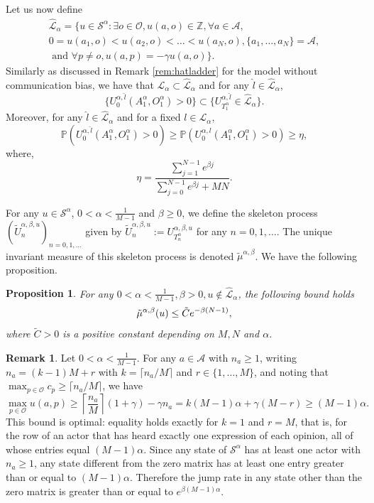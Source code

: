 \documentclass[11pt]{article}
\newtheorem{proposition}[theorem]{Proposition}
\theoremstyle{definition}
\newtheorem{remark}{Remark}
\newcommand\ddfrac[2]{\frac{\displaystyle #1}{\displaystyle #2}}
\newcommand{\st}{\mathcal{S}}
\newcommand{\A}{\mathcal{A}}
\newcommand{\opn}{\mathcal{O}}
\begin{document}
Let us now define
\begin{multline*}
    \hat{\mathcal{L}}_{\alpha}=\{u\in\mathcal{S}^{\alpha}:\exists o\in\mathcal{O}, u(a,o) \in \mathbb{Z}, \forall a \in \A, \\
    0=u(a_1,o) < u(a_2,o) < \ldots < u(a_N,o), \{a_1,\ldots,a_N\}=\A,
    \\
    \text{ and } \forall p\neq o, u(a,p)=-\gamma u(a,o)\}.
\end{multline*}
Similarly as discussed in Remark \ref{rem:hatladder} for the model without communication bias, we have that $\mathcal{L}_{\alpha}\subset \hat{\mathcal{L}}_{\alpha}$ and for any $\hat{l} \in \hat{\mathcal{L}}_{\alpha}$, 
$$\{U^{\alpha,\hat{l}}_0(A_1^{\alpha},O_1^{\alpha})>0\} \subset \{ U^{\alpha,\hat{l}}_{T_1^{\alpha}} \in \hat{\mathcal{L}}_{\alpha}\}.
$$
Moreover, for any $\hat{l}\in\hat{\mathcal{L}}_{\alpha}$ and for a fixed $l\in \mathcal{L}_{\alpha}$,
$$
\mathbb{P}(U^{\alpha,\hat{l}}_0(A_1^{\alpha},O_1^{\alpha})>0)\geq \mathbb{P}(U^{\alpha,l}_0(A_1^{\alpha},O_1^{\alpha})>0)\geq \eta,
$$
where,
    $$
        \eta = \ddfrac{\sum^{N-1}_{j=1}e^{\beta j}}{\sum^{N-1}_{j=0}e^{\beta j}+MN}.
    $$


For any $u\in \st^{\alpha}$, $0<\alpha<\frac{1}{M-1}$ and $\beta \geq 0$, we define the skeleton process $(\tilde{U}_n^{\alpha,\beta,u})_{n=0,1,\ldots}$ given by $\tilde{U}_n^{\alpha,\beta,u}:= U_{T_n^{\alpha}}^{\alpha,\beta,u}$ for any $n=0,1,\ldots$. The unique invariant measure of this skeleton process is denoted $\tilde{\mu}^{\alpha,\beta}$. 
We have the following proposition. 
    
\begin{proposition}\label{theo2prop1_2}
     For any $0<\alpha<\frac{1}{M-1}, \beta>0, u\notin\hat{\mathcal{L}}_{\alpha}$, the following bound holds
    $$
        \Tilde{\mu}^{\alpha,\beta}(u)\leq \tilde{C}e^{-\beta(N-1)},
    $$
    where $\tilde{C}>0$ is a positive constant depending on $M,N$ and $\alpha$.
\end{proposition}


\begin{remark} \label{rem:jumpratelowerboundalpha}
Let $0<\alpha<\frac{1}{M-1}$. For any $a\in\A$ with $n_a\geq 1$, writing $n_a=(k-1)M+r$ with $k=\lceil n_a/M \rceil$ and $r\in\{1,\ldots,M\}$, and noting that $\max_{p\in\opn}c_p\geq \lceil n_a/M \rceil$, we have
$$
\max_{p\in\opn}u(a,p)\geq \left\lceil \frac{n_a}{M} \right\rceil(1+\gamma)-\gamma n_a
= k(M-1)\alpha+\gamma(M-r)\geq (M-1)\alpha.
$$
This bound is optimal: equality holds exactly for $k=1$ and $r=M$, that is, for the row of an actor that has heard exactly one expression of each opinion, all of whose entries equal $(M-1)\alpha$. Since any state of $\st^{\alpha}$ has at least one actor with $n_a\geq 1$, any state different from the zero matrix has at least one entry greater than or equal to $(M-1)\alpha$. Therefore the jump rate in any state other than the zero matrix is greater than or equal to $e^{\beta (M-1)\alpha}$. 
\end{remark}
\end{document}
